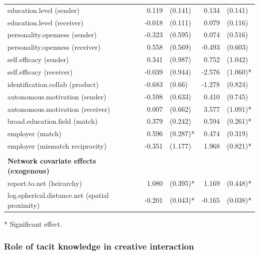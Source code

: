 \begin{table}[]
\begin{threeparttable}
\begin{tabular}{@{}lrlrl@{}}
			education.level (sender)                        & 0.119   	& (0.141)  	& 0.134 	& (0.141) 	\\
			education.level (receiver)                      & -0.018  	& (0.111)  	& 0.079 	& (0.116) 	\\
			personality.openness (sender)                   & -0.323  	& (0.595)  	& 0.074 	& (0.516) 	\\
			personality.openness (receiver)                 & 0.558   	& (0.569)  	& -0.493	& (0.603) 	\\
			self.efficacy (sender)                          & 0.341   	& (0.987)  	& 0.752 	& (1.042) 	\\
			self.efficacy (receiver)                        & -0.039  	& (0.944)  	& -2.576	& (1.060)* 	\\
			identification.collab (product)                 & -0.683  	& (0.66)   	& -1.278	& (0.824) 	\\
			autonomous.motivation (sender)                  & -0.598  	& (0.633)  	& 0.410 	& (0.745) 	\\
			autonomous.motivation (receiver)                & 0.007   	& (0.662)  	& 3.577 	& (1.091)*	\\
			broad.education.field (match)                   & 0.379   	& (0.242)  	& 0.594 	& (0.261)*	\\
			employer (match) 								& 0.596   	& (0.287)* 	& 0.474 	& (0.319) 	\\
			employer (mismatch reciprocity)                 & -0.351  	& (1.177)  	& 1.968 	& (0.821)*	\\
															&         	&          	&       	&         	\\
			\textbf{Network covariate effects (exogenous)}  &         	&          	&       	&         	\\
			report.to.net (heirarchy)                       & 1.080   	& (0.395)* 	& 1.169 	& (0.448)*	\\
			log.spherical.distance.net (spatial proximity)  & -0.201  	& (0.043)* 	& -0.165	& (0.038)*	\\ \bottomrule
		\end{tabular}
		\begin{tablenotes}
			\small
			\item [*] Significant effect.
		\end{tablenotes}
	\end{threeparttable}
\end{table}


\subsubsection{Role of tacit knowledge in creative interaction}

